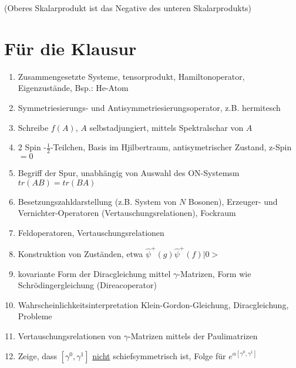 \documentclass[twoside,a4paper]{scrartcl}
\renewcommand{\1}{\mathds{1}}
\begin{document}
{\begin{enumerate}
(Oberes Skalarprodukt ist das Negative des unteren Skalarprodukts)
\end{enumerate}
}{}

% 
\section{Für die Klausur}
\begin{enumerate}
\item Zusammengesetzte Systeme, tensorprodukt, Hamiltonoperator, Eigenzustände, Bsp.: He-Atom
\item Symmetriesierungs- und Antisymmetriesierungsoperator, z.B. hermitesch
\item Schreibe $f(A)$, $A$ selbstadjungiert, mittels Spektralschar von $A$
\item 2 Spin -$\frac{1}{2}$-Teilchen, Basis im Hjilbertraum, antisymetrischer Zustand, z-Spin$=0$
\item Begriff der Spur, unabhängig von Auswahl des ON-Systemsm $tr(AB)=tr(BA)$
\item Besetzungszahldarstellung (z.B. System von $N$ Bosonen), Erzeuger- und Vernichter-Operatoren (Vertauschungsrelationen), Fockraum
\item Feldoperatoren, Vertauschungsrelationen
\item Konstruktion von Zuständen, etwa $\hat \psi^+(g)\hat \psi^+(f)|0>$
\item kovariante Form der Diracgleichung mittel $\gamma$-Matrizen, Form wie Schrödingergleichung (Direacoperator)
\item Wahrscheinlichkeitsinterpretation Klein-Gordon-Gleichung, Diracgleichung, Probleme
\item Vertauschungsrelationen von $\gamma$-Matrizen mittels der Paulimatrizen
\item Zeige, dass $[\gamma^0,\gamma^1]$ \underline{nicht} schiefsymmetrisch ist, Folge für $e^{\alpha[\gamma^0,\gamma^1]}$
\end{enumerate}






\end{document}
